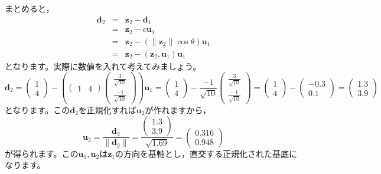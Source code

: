 \documentclass{ltjsbook}
\begin{document}
まとめると，
\[
	\begin{array}{lll}
		\bm{d}_2 & = & \bm{z}_2 - \bm{d}_1                           \\
		         & = & \bm{z}_2 -c\bm{u}_1                           \\
		         & = & \bm{z}_2 - (\|\bm{z}_2\| \cos \theta)\bm{u}_1 \\
		         & = & \bm{z}_2 -(\bm{z}_2,\bm{u}_1)\bm{u}_1
	\end{array}
\]
となります。実際に数値を入れて考えてみましょう。
\[ \bm{d}_2 =
	\begin{pmatrix}1\\4\end{pmatrix} -
	\left (
	\begin{pmatrix}1&4\end{pmatrix}
	\begin{pmatrix}\frac{3}{\sqrt{10}}\\\frac{-1}{\sqrt{10}}\end{pmatrix}
	\right )
	\bm{u}_1 =
	\begin{pmatrix}1\\4\end{pmatrix} -
	\frac{-1}{\sqrt{10}}
	\begin{pmatrix}\frac{3}{\sqrt{10}} \\\frac{-1}{\sqrt{10}}\end{pmatrix}
	=
	\begin{pmatrix}1\\4\end{pmatrix} -
	\begin{pmatrix}-0.3\\0.1 \end{pmatrix}
	=
	\begin{pmatrix}1.3\\ 3.9\end{pmatrix}
\]
となります。この$\bm{d}_2$を正規化すれば$\bm{u}_2$が作れますから，
\[ \bm{u}_2 = \frac{\bm{d}_2}{\|\bm{d}_2\|} = \frac{\begin{pmatrix}1.3\\3.9\end{pmatrix}}{\sqrt{1.69}}= \begin{pmatrix}0.316 \\ 0.948 \end{pmatrix} \]
が得られます。この$\bm{u}_1,\bm{u}_2$は$\bm{z}_1$の方向を基軸とし，直交する正規化された基底になります。
\end{document}
